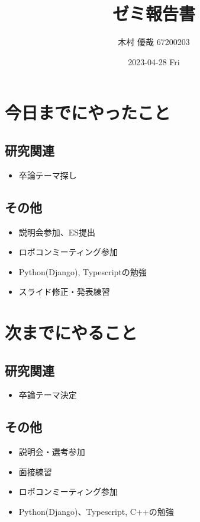\documentclass[uplatex, onecolumn, 10pt]{jsarticle}
\begin{document}
\title{\vspace{-40mm}\bf{\LARGE{ゼミ報告書}}}
\author{\vspace{-40mm}木村 優哉 67200203}
\date{2023-04-28 Fri}
\maketitle


\section{今日までにやったこと}

\subsection*{研究関連}
\begin{itemize}
	\item 卒論テーマ探し
\end{itemize}

\subsection*{その他}
\begin{itemize}
	\item 説明会参加、ES提出
	\item ロボコンミーティング参加
	\item Python(Django), Typescriptの勉強
	\item スライド修正・発表練習
\end{itemize}


\section{次までにやること}

\subsection*{研究関連}
\begin{itemize}
	\item 卒論テーマ決定
\end{itemize}

\subsection*{その他}
\begin{itemize}
	\item 説明会・選考参加
	\item 面接練習
	\item ロボコンミーティング参加
	\item Python(Django)、Typescript, C++の勉強
\end{itemize}
\end{document}
